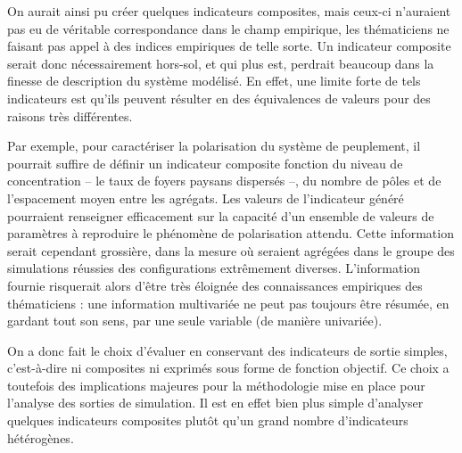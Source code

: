 On aurait ainsi pu créer quelques indicateurs composites, mais ceux-ci n'auraient pas eu de véritable correspondance dans le champ empirique, les thématiciens ne faisant pas appel à des indices empiriques de telle sorte.
Un indicateur composite serait donc nécessairement \og hors-sol\fg{}, et qui plus est, perdrait beaucoup dans la finesse de description du système modélisé.
En effet, une limite forte de tels indicateurs est qu'ils peuvent résulter en des équivalences de valeurs pour des raisons très différentes.

Par exemple, pour caractériser la polarisation du système de peuplement, il pourrait suffire de définir un indicateur composite fonction du niveau de concentration -- le taux de foyers paysans dispersés --, du nombre de pôles et de l'espacement moyen entre les agrégats.
Les valeurs de l'indicateur généré pourraient renseigner efficacement sur la capacité d'un ensemble de valeurs de paramètres à reproduire le phénomène de polarisation attendu.
Cette information serait cependant grossière, dans la mesure où seraient agrégées dans le groupe des \og simulations réussies\fg{} des configurations extrêmement diverses.
L'information fournie risquerait alors d'être très éloignée des connaissances empiriques des thématiciens :
une information multivariée ne peut pas toujours être résumée, en gardant tout son sens, par une seule variable (de manière univariée).

On a donc fait le choix d'évaluer \simfeodal{} en conservant des indicateurs de sortie \og simples\fg{}, c'est-à-dire ni composites ni exprimés sous forme de fonction objectif.
Ce choix a toutefois des implications majeures pour la méthodologie mise en place pour l'analyse des sorties de simulation.
Il est en effet bien plus simple d'analyser quelques indicateurs composites plutôt qu'un grand nombre d'indicateurs hétérogènes.

